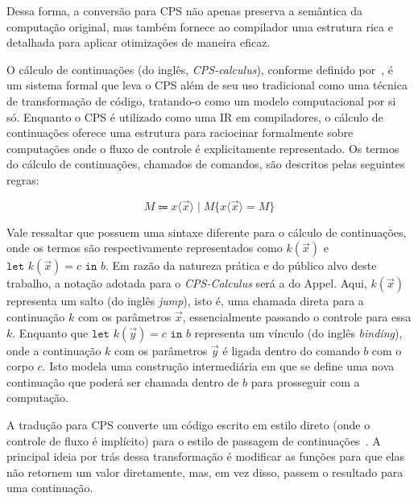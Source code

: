 Dessa forma, a conversão para CPS não apenas preserva a semântica da computação original, mas também fornece ao compilador uma estrutura rica e detalhada para aplicar otimizações de maneira eficaz.

O cálculo de continuações (do inglês, \textit{CPS-calculus}), conforme definido por~, é um sistema formal que leva o CPS além de seu uso tradicional como uma técnica de transformação de código, tratando-o como um modelo computacional por si só.
Enquanto o CPS é utilizado como uma IR em compiladores, o cálculo de continuações oferece uma estrutura para raciocinar formalmente sobre computações onde o fluxo de controle é explicitamente representado.
Os termos do cálculo de continuações, chamados de comandos, são descritos pelas seguintes regras:

\begin{equation*}
  M \Coloneqq x\langle \vec{x} \rangle \mid M\{x\langle \vec{x} \rangle = M\}
\end{equation*}

Vale ressaltar que  possuem uma sintaxe diferente para o cálculo de continuações, onde os termos são respectivamente representados como $k(\vec{x})$ e $\texttt{let }k(\vec{x}) = c \texttt{ in } b$.
Em razão da natureza prática e do público alvo deste trabalho, a notação adotada para o \textit{CPS-Calculus} será a do Appel.
Aqui, $k(\vec{x})$ representa um salto (do inglês \textit{jump}), isto é, uma chamada direta para a continuação $k$ com os parâmetros $\vec{x}$, essencialmente passando o controle para essa $k$.
Enquanto que $\texttt{let }k(\vec{y}) = c \texttt{ in } b$ representa um vínculo (do inglês \textit{binding}), onde a continuação $k$ com os parâmetros $\vec{y}$ é ligada dentro do comando $b$ com o corpo $c$.
Isto modela uma construção intermediária em que se define uma nova continuação que poderá ser chamada dentro de $b$ para prosseguir com a computação.

A tradução para CPS converte um código escrito em estilo direto (onde o controle de fluxo é implícito) para o estilo de passagem de continuações~\cite{flanagan1993essence}.
A principal ideia por trás dessa transformação é modificar as funções para que elas não retornem um valor diretamente, mas, em vez disso, passem o resultado para uma continuação.





